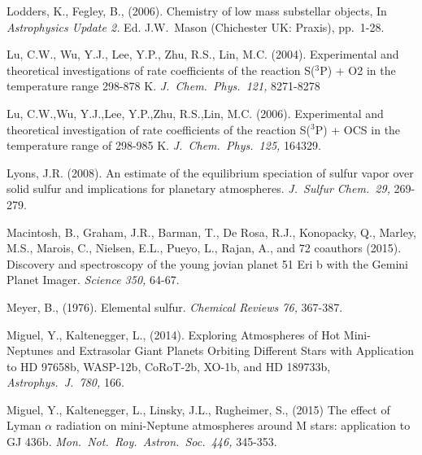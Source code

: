 \documentclass[preprint]{aastex6}
\newcounter{reaction}
\begin{document}
\begin{thebibliography}{00}

Lodders, K., Fegley, B., (2006).  Chemistry of low mass substellar
objects,
In {\em Astrophysics Update 2.} Ed. J.W.\ Mason (Chichester UK: Praxis), pp.\ 1-28.

Lu, C.W., Wu, Y.J., Lee, Y.P., Zhu, R.S., Lin, M.C. (2004). Experimental and theoretical investigations of rate coefficients of the reaction S($^3$P) + O2 in the temperature range 298-878 K.  {\em J.\ Chem.\ Phys.\ 121,} 8271-8278

Lu, C.W.,Wu, Y.J.,Lee, Y.P.,Zhu, R.S.,Lin, M.C. (2006).  Experimental and theoretical investigation of rate coefficients of the reaction S($^3$P) + OCS in the temperature range of 298-985 K.  {\em J.\ Chem.\ Phys.\ 125,} 164329.

Lyons, J.R. (2008). 
An estimate of the equilibrium speciation of sulfur vapor over solid sulfur and implications for planetary atmospheres.
{\em J.\ Sulfur Chem.\ 29,} 269-279.

Macintosh, B., Graham, J.R., Barman, T., De Rosa, R.J., Konopacky, Q., Marley, M.S., Marois, C., Nielsen, E.L., Pueyo, L., Rajan, A., and 72 coauthors (2015).  Discovery and spectroscopy of the young jovian planet 51 Eri b with the Gemini Planet Imager. {\em Science 350,} 64-67.

 
 Meyer, B., (1976). Elemental sulfur.
 {\em Chemical Reviews 76,} 367-387.

Miguel, Y., Kaltenegger, L., (2014).
Exploring Atmospheres of Hot Mini-Neptunes and Extrasolar Giant Planets Orbiting Different Stars with Application to HD 97658b, WASP-12b, CoRoT-2b, XO-1b, and HD 189733b,
{\em Astrophys.\ J.\  780,} 166. 

Miguel, Y., Kaltenegger, L., Linsky, J.L., Rugheimer, S., (2015)
The effect of Lyman $\alpha$ radiation on mini-Neptune atmospheres around M stars: application to GJ 436b.
{\em Mon.\ Not.\ Roy.\ Astron.\ Soc.\  446,} 345-353. 


\end{thebibliography}
\end{document}
